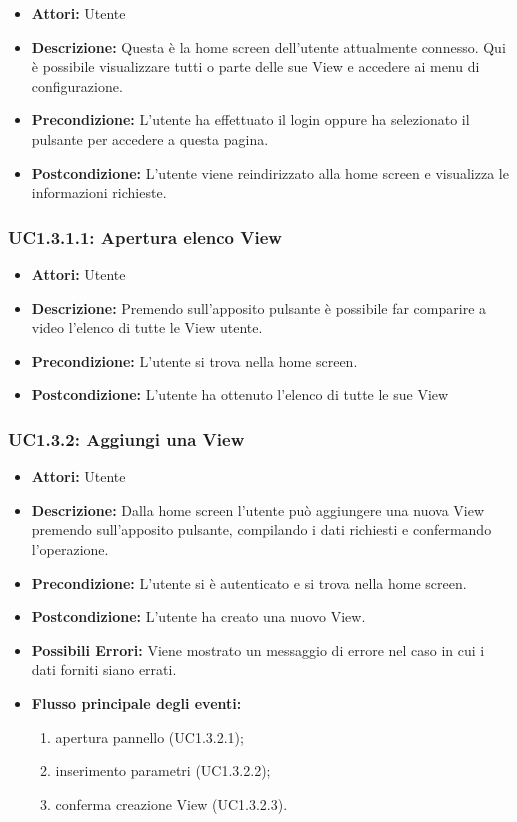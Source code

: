 \begin{itemize}
    \item \textbf{Attori:} Utente
    \item \textbf{Descrizione:} Questa è la home screen dell'utente attualmente connesso. Qui è possibile visualizzare tutti o parte delle sue View e accedere ai menu di configurazione.
    \item \textbf{Precondizione:} L'utente ha effettuato il login oppure ha selezionato il pulsante per accedere a questa pagina.
    \item \textbf{Postcondizione:} L'utente viene reindirizzato alla home screen e visualizza le informazioni richieste.
\end{itemize}

\subsubsection{UC1.3.1.1: Apertura elenco View}

\begin{itemize}
    \item \textbf{Attori:} Utente
    \item \textbf{Descrizione:} Premendo sull'apposito pulsante è possibile far comparire a video l'elenco di tutte le View utente.
    \item \textbf{Precondizione:} L'utente si trova nella home screen.
    \item \textbf{Postcondizione:} L'utente ha ottenuto l'elenco di tutte le sue View
\end{itemize}

\subsubsection{UC1.3.2: Aggiungi una View}

\begin{itemize}
    \item \textbf{Attori:} Utente
    \item \textbf{Descrizione:} Dalla home screen l'utente può aggiungere una nuova View premendo sull'apposito pulsante, compilando i dati richiesti e confermando l'operazione.
    \item \textbf{Precondizione:} L'utente si è autenticato e si trova nella home screen.
    \item \textbf{Postcondizione:} L'utente ha creato una nuovo View.
	\item \textbf{Possibili Errori:}
    Viene mostrato un messaggio di errore nel caso in cui i dati forniti siano errati.
    \item \textbf{Flusso principale degli eventi:}

    \begin{enumerate}
        \item apertura pannello (UC1.3.2.1);
        \item inserimento parametri (UC1.3.2.2);
        \item conferma creazione View (UC1.3.2.3).
    \end{enumerate}

\end{itemize}

